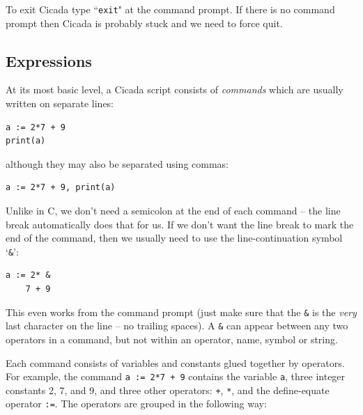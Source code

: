 \documentclass{article}
\newenvironment{code}{
       \begin{list}{}{
               \setlength{\leftmargin}{.4in}
               \setlength{\rightmargin}{0in}
               \setlength{\topsep}{.2in}
       }
       \small
       \item[] }
       { \end{list}   }
\begin{document}
To exit Cicada type ``\texttt{exit}" at the command prompt.  If there is no command prompt then Cicada is probably stuck and we need to force quit.





\subsection{Expressions}

At its most basic level, a Cicada script consists of \emph{commands} which are usually written on separate lines:

\begin{code} \begin{verbatim}
a := 2*7 + 9
print(a)
\end{verbatim} \end{code}

\noindent although they may also be separated using commas:

\begin{code} \begin{verbatim}
a := 2*7 + 9, print(a)
\end{verbatim} \end{code}

Unlike in C, we don't need a semicolon at the end of each command -- the line break automatically does that for us.  If we don't want the line break to mark the end of the command, then we usually need to use the line-continuation symbol `\texttt{\&}':

\begin{code} \begin{verbatim}
a := 2* &
    7 + 9
\end{verbatim} \end{code}

\noindent This even works from the command prompt (just make sure that the \texttt{\&} is the \emph{very} last character on the line -- no trailing spaces).  A \verb#&# can appear between any two operators in a command, but not within an operator, name, symbol or string.

Each command consists of variables and constants glued together by operators.  For example, the command \verb#a := 2*7 + 9# contains the variable \verb#a#, three integer constants 2, 7, and 9, and three other operators:  \verb#+#, \verb#*#, and the define-equate operator \verb#:=#. The operators are grouped in the following way:
\end{document}
